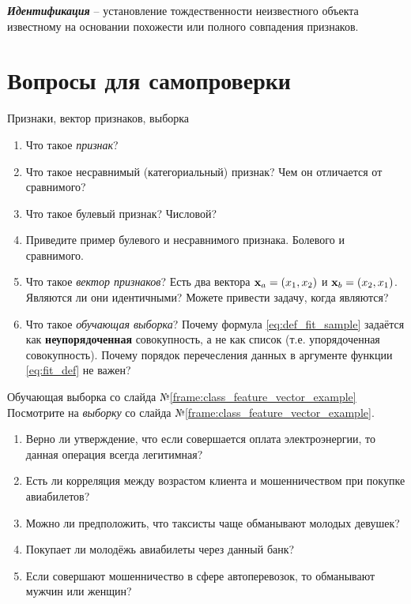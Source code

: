 \documentclass{beamer}
\newcommand{\termdef}[1]{\textbf{\textit{#1}}}
\newcommand{\term}{\textit}
\begin{document}
   \begin{frame}
   \termdef{Идентификация} -- установление тождественности неизвестного объекта известному на основании похожести или полного совпадения признаков.
   
   \end{frame}
   
   \section{Вопросы для самопроверки}

   \begin{frame}{Признаки, вектор признаков, выборка}
   \begin{enumerate}
   	\item Что такое \term{признак}?
   	\item Что такое несравнимый (категориальный) признак? Чем он отличается от сравнимого?
   	\item Что такое булевый признак? Числовой?
   	\item Приведите пример булевого и несравнимого признака. Болевого и сравнимого. 
   	\item Что такое \term{вектор признаков}? Есть два вектора $\bold x_a = (x_1, x_2)$ и $\bold x_b = (x_2, x_1)$.
   	Являются ли они идентичными? Можете привести задачу, когда являются?
   	\item Что такое \term{обучающая выборка}? Почему формула \eqref{eq:def_fit_sample} задаётся
   	как \textbf{неупорядоченная} совокупность, а не как список (т.е. упорядоченная совокупность).
   	Почему порядок перечесления данных в аргументе функции \eqref{eq:fit_def} не важен?
   \end{enumerate}
	\end{frame}

   \begin{frame}{Обучающая выборка со слайда №\ref{frame:class_feature_vector_example}}
 	Посмотрите на \term{выборку} со слайда №\ref{frame:class_feature_vector_example}. 
 	\begin{enumerate}
 	\item Верно ли утверждение, что если совершается оплата электроэнергии, то данная операция всегда легитимная?
 	\item Есть ли корреляция между возрастом клиента и мошенничеством при покупке авиабилетов? 
 	\item Можно ли предположить, что таксисты чаще обманывают молодых девушек? 
 	\item Покупает ли молодёжь авиабилеты через данный банк? 
 	\item Если совершают мошенничество в сфере автоперевозок, то обманывают мужчин или женщин?
	\end{enumerate}
	\end{frame}
  
\end{document}
